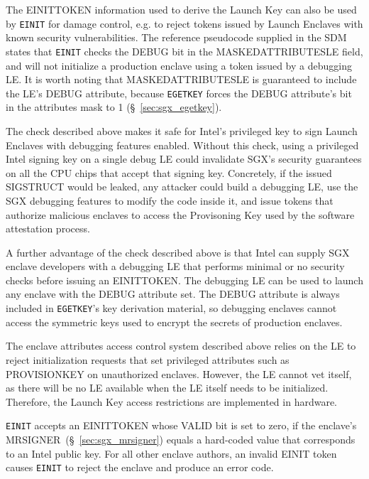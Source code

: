 The EINITTOKEN information used to derive the Launch Key can also be used
by \texttt{EINIT} for damage control, e.g. to reject tokens issued by Launch
Enclaves with known security vulnerabilities. The reference pseudocode supplied
in the SDM states that \texttt{EINIT} checks the DEBUG bit in the
MASKEDATTRIBUTESLE field, and will not initialize a production enclave using
a token issued by a debugging LE. It is worth noting that MASKEDATTRIBUTESLE is
guaranteed to include the LE's DEBUG attribute, because \texttt{EGETKEY} forces
the DEBUG attribute's bit in the attributes mask to 1
(\S~\ref{sec:sgx_egetkey}).

The check described above makes it safe for Intel's privileged key to sign
Launch Enclaves with debugging features enabled. Without this check, using a
privileged Intel signing key on a single debug LE could invalidate SGX's
security guarantees on all the CPU chips that accept that signing key.
Concretely, if the issued SIGSTRUCT would be leaked, any attacker could build a
debugging LE, use the SGX debugging features to modify the code inside it, and
issue tokens that authorize malicious enclaves to access the Provisoning Key
used by the software attestation process.

A further advantage of the check described above is that Intel can supply SGX
enclave developers with a debugging LE that performs minimal or no security
checks before issuing an EINITTOKEN. The debugging LE can be used to launch any
enclave with the DEBUG attribute set. The DEBUG attribute is always included in
\texttt{EGETKEY}'s key derivation material, so debugging enclaves cannot access
the symmetric keys used to encrypt the secrets of production enclaves.


The enclave attributes access control system described above relies on the LE
to reject initialization requests that set privileged attributes such as
PROVISIONKEY on unauthorized enclaves. However, the LE cannot vet itself, as
there will be no LE available when the LE itself needs to be initialized.
Therefore, the Launch Key access restrictions are implemented in hardware.

\texttt{EINIT} accepts an EINITTOKEN whose VALID bit is set to zero, if
the enclave's MRSIGNER~(\S~\ref{sec:sgx_mrsigner}) equals a hard-coded value
that corresponds to an Intel public key. For all other enclave authors, an
invalid EINIT token causes \texttt{EINIT} to reject the enclave and produce an
error code.

